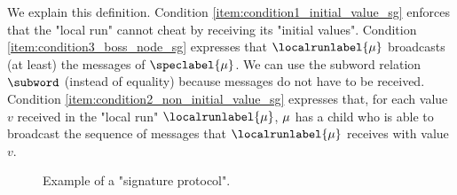 We explain this definition. Condition \ref{item:condition1_initial_value_sg} enforces that the "local run" cannot cheat by receiving its "initial values". 
 Condition \ref{item:condition3_boss_node_sg} expresses that $\localrunlabel{\node}$ broadcasts (at least) the messages of $\speclabel{\node}$. We can use the subword relation $\subword$ (instead of equality) because messages do not have to be received.  
Condition \ref{item:condition2_non_initial_value_sg} expresses that, for each value $v$ received in the "local run" $\localrunlabel{\node}$, $\mu$ has a child who is able to broadcast the sequence of messages that $\localrunlabel{\node}$ receives with value $v$. 
\begin{figure}[t]
	\centering
	\resizebox*{!}{3.5cm}{
	
	}
	\caption{Example of a "signature protocol".}\label{fig:ex2}\label{fig:example-signature-protocol}
\end{figure}
